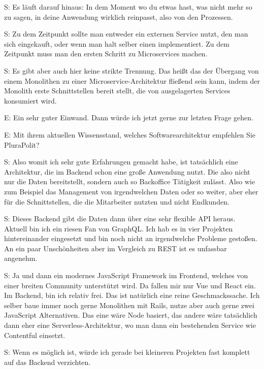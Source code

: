  \label{appendix:s-28}
S: Es läuft darauf hinaus: In dem Moment wo du etwas hast, was nicht mehr so zu sagen, in deine Anwendung wirklich reinpasst, also von den Prozessen.

 \label{appendix:s-29}
S: Zu dem Zeitpunkt sollte man entweder ein externen Service nutzt, den man sich eingekauft, oder wenn man halt selber einen implementiert. Zu dem Zeitpunkt muss man den ersten Schritt zu Microservices machen. 

 \label{appendix:s-30}
S: Es gibt aber auch hier keine strikte Trennung. Das heißt das der Übergang von einem Monolithen zu einer Microservice-Architektur fließend sein kann, indem der Monolith erste Schnittstellen bereit stellt, die von ausgelagerten Services konsumiert wird.


E: Ein sehr guter Einwand. Dann würde ich jetzt gerne zur letzten Frage gehen.

E: Mit ihrem aktuellen Wissensstand, welches Softwarearchitektur empfehlen Sie PluraPolit?

 \label{appendix:s-31}
S:  Also womit ich sehr gute Erfahrungen gemacht habe, ist tatsächlich eine Architektur, die im Backend schon eine große Anwendung nutzt. Die also nicht nur die Daten bereitstellt, sondern auch so Backoffice Tätigkeit zulässt. Also wie zum Beispiel das Management von irgendwelchen Daten oder so weiter, aber eher für die Schnittstellen, die die Mitarbeiter nutzten und nicht Endkunden.

 \label{appendix:s-32}
S: Dieses Backend gibt die Daten dann über eine sehr flexible API heraus. Aktuell bin ich ein riesen Fan von GraphQL. Ich hab es in vier Projekten hintereinander eingesetzt und bin noch nicht an irgendwelche Probleme gestoßen. An ein paar Unschönheiten aber im Vergleich zu REST ist es unfassbar angenehm. 

 \label{appendix:s-33}
S: Ja und dann ein modernes JavaScript Framework im Frontend, welches von einer breiten Community unterstützt wird. Da fallen mir nur Vue und React ein. Im Backend, bin ich relativ frei. Das ist natürlich eine reine Geschmackssache. Ich selber baue immer noch gerne Monolithen mit Rails, nutze aber auch gerne zwei JavaScript Alternativen. Das eine wäre Node basiert, das andere wäre tatsächlich dann eher eine Serverless-Architektur, wo man dann ein bestehenden Service wie Contentful einsetzt. 

 \label{appendix:s-34}
S: Wenn es möglich ist, würde ich gerade bei kleineren Projekten fast komplett auf das Backend verzichten.

